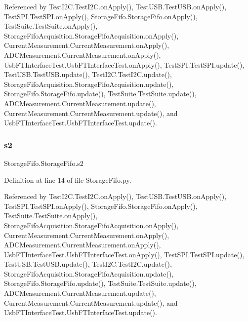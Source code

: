 Referenced by Test\+I2\+C.\+Test\+I2\+C.\+on\+Apply(), Test\+U\+S\+B.\+Test\+U\+S\+B.\+on\+Apply(), Test\+S\+P\+I.\+Test\+S\+P\+I.\+on\+Apply(), Storage\+Fifo.\+Storage\+Fifo.\+on\+Apply(), Test\+Suite.\+Test\+Suite.\+on\+Apply(), Storage\+Fifo\+Acquisition.\+Storage\+Fifo\+Acquisition.\+on\+Apply(), Current\+Measurement.\+Current\+Measurement.\+on\+Apply(), A\+D\+C\+Measurement.\+Current\+Measurement.\+on\+Apply(), Usb\+F\+T\+Interface\+Test.\+Usb\+F\+T\+Interface\+Test.\+on\+Apply(), Test\+S\+P\+I.\+Test\+S\+P\+I.\+update(), Test\+U\+S\+B.\+Test\+U\+S\+B.\+update(), Test\+I2\+C.\+Test\+I2\+C.\+update(), Storage\+Fifo\+Acquisition.\+Storage\+Fifo\+Acquisition.\+update(), Storage\+Fifo.\+Storage\+Fifo.\+update(), Test\+Suite.\+Test\+Suite.\+update(), A\+D\+C\+Measurement.\+Current\+Measurement.\+update(), Current\+Measurement.\+Current\+Measurement.\+update(), and Usb\+F\+T\+Interface\+Test.\+Usb\+F\+T\+Interface\+Test.\+update().

\mbox{\label{classStorageFifo_1_1StorageFifo_ac8ae47a5852b5eac23b0cefa7d335c13}} 
\subsubsection{\texorpdfstring{s2}{s2}}
{\footnotesize\ttfamily Storage\+Fifo.\+Storage\+Fifo.\+s2}



Definition at line 14 of file Storage\+Fifo.\+py.



Referenced by Test\+I2\+C.\+Test\+I2\+C.\+on\+Apply(), Test\+U\+S\+B.\+Test\+U\+S\+B.\+on\+Apply(), Test\+S\+P\+I.\+Test\+S\+P\+I.\+on\+Apply(), Storage\+Fifo.\+Storage\+Fifo.\+on\+Apply(), Test\+Suite.\+Test\+Suite.\+on\+Apply(), Storage\+Fifo\+Acquisition.\+Storage\+Fifo\+Acquisition.\+on\+Apply(), Current\+Measurement.\+Current\+Measurement.\+on\+Apply(), A\+D\+C\+Measurement.\+Current\+Measurement.\+on\+Apply(), Usb\+F\+T\+Interface\+Test.\+Usb\+F\+T\+Interface\+Test.\+on\+Apply(), Test\+S\+P\+I.\+Test\+S\+P\+I.\+update(), Test\+U\+S\+B.\+Test\+U\+S\+B.\+update(), Test\+I2\+C.\+Test\+I2\+C.\+update(), Storage\+Fifo\+Acquisition.\+Storage\+Fifo\+Acquisition.\+update(), Storage\+Fifo.\+Storage\+Fifo.\+update(), Test\+Suite.\+Test\+Suite.\+update(), A\+D\+C\+Measurement.\+Current\+Measurement.\+update(), Current\+Measurement.\+Current\+Measurement.\+update(), and Usb\+F\+T\+Interface\+Test.\+Usb\+F\+T\+Interface\+Test.\+update().

